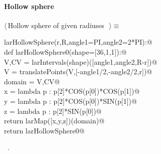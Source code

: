 \documentclass[11pt,oneside]{article}	%
\begin{document}
\paragraph{Hollow sphere}
\begin{flushleft} \small \label{scrap20}
$\langle\,$Hollow sphere of given radiuses\nobreak\ {\footnotesize {}}$\,\rangle\equiv$
\vspace{-1ex}
\begin{list}{}{} \item
\mbox{}\verb@def larHollowSphere(r,R,angle1=PI,angle2=2*PI):@\\
\mbox{}\verb@   def larHollowSphere0(shape=[36,1,1]):@\\
\mbox{}\verb@      V,CV = larIntervals(shape)([angle1,angle2,R-r])@\\
\mbox{}\verb@      V = translatePoints(V,[-angle1/2,-angle2/2,r])@\\
\mbox{}\verb@      domain = V,CV@\\
\mbox{}\verb@      x = lambda p : p[2]*COS(p[0])*COS(p[1])@\\
\mbox{}\verb@      y = lambda p : p[2]*COS(p[0])*SIN(p[1])@\\
\mbox{}\verb@      z = lambda p : p[2]*SIN(p[0])@\\
\mbox{}\verb@      return larMap([x,y,z])(domain)@\\
\mbox{}\verb@   return larHollowSphere0@\\
\mbox{}\verb@@{\NWsep}
\end{list}
\vspace{-1ex}
\footnotesize\addtolength{\baselineskip}{-1ex}
\begin{list}{}{\setlength{\itemsep}{-\parsep}\setlength{\itemindent}{-\leftmargin}}
\item \NWtxtMacroRefIn\ .
\end{list}
\end{flushleft}
\end{document}
